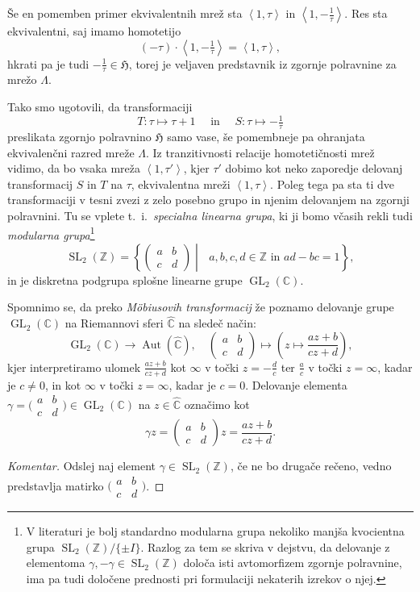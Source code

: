 \documentclass[mat1]{fmfdelo}
\numberwithin{equation}{section}
\newcommand{\Z}{\mathbb Z}
\newcommand{\C}{\mathbb C}
\newcommand{\HH}{\mathfrak{H}}
\newcommand{\RS}{\widehat{\C}}
\newcommand{\SL}{\operatorname{SL}_2(\Z)}
\newcommand{\abcd}{\big(\begin{smallmatrix} a & b\\c & d \end{smallmatrix}\big)}
\newcommand{\pabcd}{\begin{pmatrix} a & b \\ c & d \end{pmatrix}}
\newcommand{\lattice}[2]{\left\langle #1, #2 \right\rangle}
\newcommand{\ti}{t.~i.\ }
\DeclareMathOperator{\GL}{GL}
\DeclareMathOperator{\Aut}{Aut}
\theoremstyle{definition}
\newenvironment{komentar}[1][Komentar]{\begin{proof}[#1]\let\qed\relax}{\end{proof}}
\begin{document}
Še en pomemben primer ekvivalentnih mrež sta $\lattice{1}{\tau}$ in $\lattice{1}{-\frac{1}{\tau}}$. Res sta ekvivalentni, saj imamo homotetijo
\[
    (-\tau)\cdot\lattice{1}{-\tfrac1\tau} = \lattice{1}{\tau},
\] 
hkrati pa je tudi $-\frac{1}{\tau} \in \HH$, torej je veljaven predstavnik iz zgornje polravnine za mrežo $\Lambda$.

Tako smo ugotovili, da transformaciji
\[
    T:\tau \mapsto \tau + 1 \quad \text{ in } \quad S:\tau \mapsto -\tfrac1\tau
\]
preslikata zgornjo polravnino $\HH$ samo vase, še pomembneje pa ohranjata ekvivalenčni razred mreže $\Lambda$. Iz tranzitivnosti relacije homotetičnosti mrež vidimo, da bo vsaka mreža $\lattice{1}{\tau'}$, kjer $\tau'$ dobimo kot neko zaporedje delovanj transformacij $S$ in $T$ na $\tau$, ekvivalentna mreži $\lattice{1}{\tau}$.
Poleg tega pa sta ti dve transformaciji v tesni zvezi z zelo posebno grupo in njenim delovanjem na zgornji polravnini.
Tu se vplete \ti \emph{specialna linearna grupa}, ki ji bomo včasih rekli tudi \emph{modularna grupa}\footnote{V literaturi je bolj standardno modularna grupa nekoliko manjša kvocientna grupa $\SL/\{\pm I\}$. Razlog za tem se skriva v dejstvu, da delovanje z elementoma $\gamma, -\gamma \in \SL$ določa isti avtomorfizem zgornje polravnine, ima pa  tudi določene prednosti pri formulaciji nekaterih izrekov o njej. 
}  
\[
    \SL = \left\{\pabcd \middle\vert \text{ } a,b,c,d \in \Z \text{ in } ad - bc = 1\right\},
\]
in je diskretna podgrupa splošne linearne grupe $\GL_2(\C)$. 

Spomnimo se, da preko \emph{Möbiusovih transformacij} že poznamo delovanje grupe $\GL_2(\C)$ na Riemannovi sferi $\RS$ na sledeč način:
\begin{equation}
    \label{eq: delovanje GL2C na CP1}
    \GL_2(\C) \to \Aut(\RS), \quad \pabcd \mapsto \left(z \mapsto \frac{az + b}{cz + d}\right),
\end{equation}
kjer interpretiramo ulomek $\frac{az + b}{cz + d}$ kot $\infty$ v točki $z = -\frac{d}{c}$ ter $\frac{a}{c}$ v točki $z = \infty$, kadar je $c \neq 0$, in kot $\infty$ v točki $z = \infty$, kadar je $c = 0$. Delovanje elementa $\gamma = \abcd \in \GL_2(\C)$ na $z \in \RS$ označimo kot
\begin{equation}
    \label{eq: predpis delovanja GL2C}
    \gamma z =  \pabcd z = \frac{az + b}{cz + d}.
\end{equation}
\begin{komentar}
    Odslej naj element $\gamma \in \SL$, če ne bo drugače rečeno, vedno predstavlja matirko $\abcd$.
\end{komentar}
\end{document}
